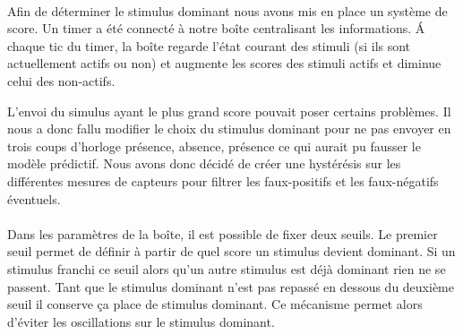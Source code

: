 \paragraph{}
Afin de déterminer le stimulus dominant nous avons mis en place un système de score. Un timer a 
été connecté à notre boîte centralisant les informations. \'A chaque tic du timer, la boîte regarde
l'état courant des stimuli (si ils sont actuellement actifs ou non) et augmente les scores des stimuli
actifs et diminue celui des non-actifs.

L'envoi du simulus ayant le plus grand score pouvait poser certains problèmes. Il nous a donc 
fallu modifier le choix du stimulus dominant pour ne pas envoyer en trois coups d'horloge
présence, absence, présence ce qui aurait pu fausser le modèle prédictif. 
Nous avons donc décidé de créer une hystérésis sur les différentes mesures de
capteurs pour filtrer les faux-positifs et les faux-négatifs éventuels. 

\paragraph{}
Dans les paramètres de la boîte, il est possible de fixer deux seuils.
Le premier seuil permet de définir à partir de quel score un stimulus devient dominant.
Si un stimulus franchi ce seuil alors qu'un autre stimulus est déjà dominant rien ne se passent.
Tant que le stimulus dominant n'est pas repassé en dessous du deuxième seuil il conserve ça place de 
stimulus dominant.
Ce mécanisme permet alors d'éviter les oscillations sur le stimulus dominant.

